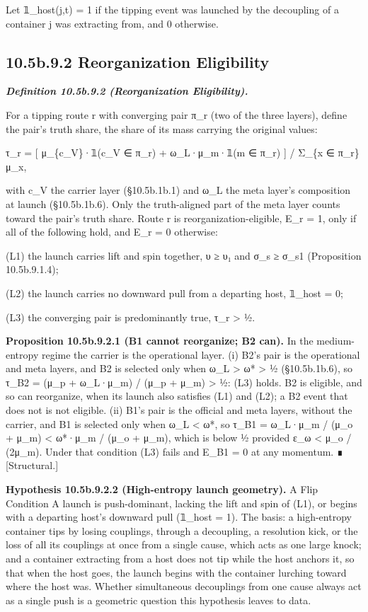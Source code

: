 \documentclass[
]{article}
\begin{document}
Let 𝟙\_host(j,t) = 1 if the tipping event was launched by the decoupling
of a container j was extracting from, and 0 otherwise.

\hypertarget{b.9.2-reorganization-eligibility}{%
\subsection{10.5b.9.2 Reorganization
Eligibility}\label{b.9.2-reorganization-eligibility}}

\emph{\textbf{Definition 10.5b.9.2 (Reorganization Eligibility).}}

For a tipping route r with converging pair π\_r (two of the three
layers), define the pair's truth share, the share of its mass carrying
the original values:

τ\_r = {[} μ\_\{c\_V\}·𝟙(c\_V ∈ π\_r) + ω\_L·μ\_m·𝟙(m ∈ π\_r) {]} /
Σ\_\{x ∈ π\_r\} μ\_x,

with c\_V the carrier layer (§10.5b.1b.1) and ω\_L the meta layer's
composition at launch (§10.5b.1b.6). Only the truth-aligned part of the
meta layer counts toward the pair's truth share. Route r is
reorganization-eligible, E\_r = 1, only if all of the following hold,
and E\_r = 0 otherwise:

(L1) the launch carries lift and spin together, υ ≥ υ₁ and σ\_s ≥ σ\_s1
(Proposition 10.5b.9.1.4);

(L2) the launch carries no downward pull from a departing host, 𝟙\_host
= 0;

(L3) the converging pair is predominantly true, τ\_r \textgreater{} ½.

\textbf{Proposition 10.5b.9.2.1 (B1 cannot reorganize; B2 can).} In the
medium-entropy regime the carrier is the operational layer. (i) B2's
pair is the operational and meta layers, and B2 is selected only when
ω\_L \textgreater{} ω* \textgreater{} ½ (§10.5b.1b.6), so τ\_B2 = (μ\_p
+ ω\_L·μ\_m) / (μ\_p + μ\_m) \textgreater{} ½: (L3) holds. B2 is
eligible, and so can reorganize, when its launch also satisfies (L1) and
(L2); a B2 event that does not is not eligible. (ii) B1's pair is the
official and meta layers, without the carrier, and B1 is selected only
when ω\_L \textless{} ω*, so τ\_B1 = ω\_L·μ\_m / (μ\_o + μ\_m)
\textless{} ω*·μ\_m / (μ\_o + μ\_m), which is below ½ provided ε\_ω
\textless{} μ\_o / (2μ\_m). Under that condition (L3) fails and E\_B1 =
0 at any momentum. ∎ {[}Structural.{]}

\textbf{Hypothesis 10.5b.9.2.2 (High-entropy launch geometry).} A Flip
Condition A launch is push-dominant, lacking the lift and spin of (L1),
or begins with a departing host's downward pull (𝟙\_host = 1). The
basis: a high-entropy container tips by losing couplings, through a
decoupling, a resolution kick, or the loss of all its couplings at once
from a single cause, which acts as one large knock; and a container
extracting from a host does not tip while the host anchors it, so that
when the host goes, the launch begins with the container lurching toward
where the host was. Whether simultaneous decouplings from one cause
always act as a single push is a geometric question this hypothesis
leaves to data.
\end{document}
